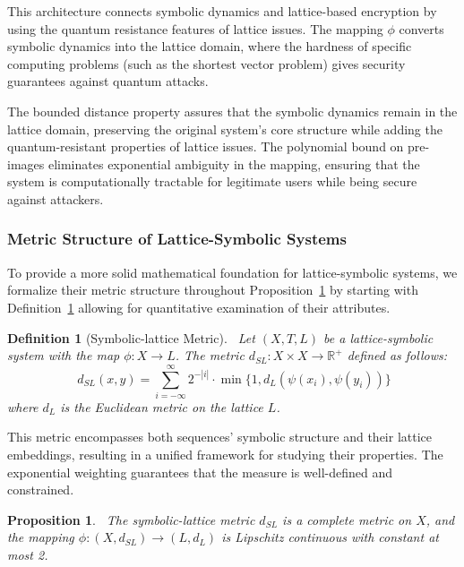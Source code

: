 \documentclass[12pt,a4paper]{article}
\newtheorem{proposition}[theorem]{Proposition}
\newtheorem{definition}{Definition}
\begin{document}
This architecture connects symbolic dynamics and lattice-based encryption by using the quantum resistance features of lattice issues.  The mapping $\phi$ converts symbolic dynamics into the lattice domain, where the hardness of specific computing problems (such as the shortest vector problem) gives security guarantees against quantum attacks.

 The bounded distance property assures that the symbolic dynamics remain in the lattice domain, preserving the original system's core structure while adding the quantum-resistant properties of lattice issues.  The polynomial bound on pre-images eliminates exponential ambiguity in the mapping, ensuring that the system is computationally tractable for legitimate users while being secure against attackers.
\subsubsection{Metric Structure of Lattice-Symbolic Systems}

To provide a more solid mathematical foundation for lattice-symbolic systems, we formalize their metric structure throughout Proposition~\ref{propositionn1} by starting with Definition~\ref{SymboliclatticeMetric} allowing for quantitative examination of their attributes.

 \begin{definition}[Symbolic-lattice Metric]~\label{SymboliclatticeMetric}
 Let $(X, T, L)$ be a lattice-symbolic system with the map $\phi: X \rightarrow L$.  The metric $d_{SL}: X \times X \rightarrow \mathbb{R}^+$ defined as follows:
\begin{equation}~\label{SymboliclatticeMetri}
d_{SL}(x, y) = \sum_{i=-\infty}^{\infty} 2^{-|i|} \cdot \min\{1, d_L(\psi(x_i), \psi(y_i))\}
\end{equation}
where $d_L$ is the Euclidean metric on the lattice $L$.
\end{definition}

This metric encompasses both sequences' symbolic structure and their lattice embeddings, resulting in a unified framework for studying their properties. The exponential weighting guarantees that the measure is well-defined and constrained.

\begin{proposition}~\label{propositionn1}
The symbolic-lattice metric $d_{SL}$ is a complete metric on $X$, and the mapping $\phi: (X, d_{SL}) \rightarrow (L, d_L)$ is Lipschitz continuous with constant at most 2.
\end{proposition}
\end{document}
